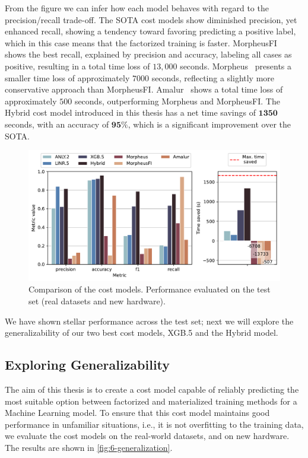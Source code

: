 From the figure we can infer how each model behaves with regard to the precision/recall trade-off. The SOTA cost models show diminished precision, yet enhanced recall, showing a tendency toward favoring predicting a positive label, which in this case means that the factorized training is faster. MorpheusFI~\cite{MorpheusFI} shows the best recall, explained by precision and accuracy, labeling all cases as positive, resulting in a total time loss of $13,000$ seconds. Morpheus~\cite{orion_learning_gen_lin_models} presents a smaller time loss of approximately $7000$ seconds, reflecting a slightly more conservative approach than MorpheusFI. Amalur~\cite{amalur} shows a total time loss of approximately $500$ seconds, outperforming Morpheus and MorpheusFI. The Hybrid cost model introduced in this thesis has a net time savings of $\mathbf{1350}$ seconds, with an accuracy of $\mathbf{95\%}$, which is a significant improvement over the SOTA.

\begin{figure}[ht]
  \centering
  \includegraphics[width=\linewidth]{chapters/06_evaluation/figures/eval_sota_results.pdf}
  \caption[Cost model comparison vs SOTA]{Comparison of the cost models. Performance evaluated on the test set (real datasets and new hardware).}
  \label{fig:6-sota-comparison}
\end{figure}

We have shown stellar performance across the test set; next we will explore the generalizability of our two best cost models, XGB.5 and the Hybrid model.

\subsection{Exploring Generalizability}
\label{subsec:6-generalizability}
The aim of this thesis is to create a cost model capable of reliably predicting the most suitable option between factorized and materialized training methods for a Machine Learning model. To ensure that this cost model maintains good performance in unfamiliar situations, i.e., it is not overfitting to the training data, we evaluate the cost models on the real-world datasets, and on new hardware. The results are shown in \autoref{fig:6-generalization}.

